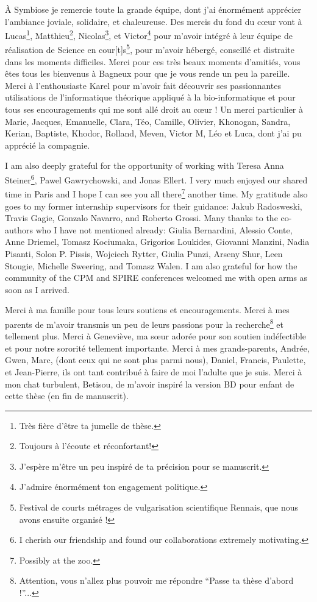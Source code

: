 À Symbiose je remercie toute la grande équipe, dont j'ai énormément apprécier l’ambiance joviale, solidaire, et chaleureuse.
Des mercis du fond du cœur vont à Lucas\footnote{Très fière d’être ta jumelle de thèse.}, Matthieu\footnote{Toujours à l'écoute et réconfortant!},  Nicolas\footnote{J’espère m’être un peu inspiré de ta précision pour se manuscrit.}, et Victor\footnote{J’admire énormément ton engagement politique.}  pour m’avoir intégré à leur équipe de réalisation de Science en cour[t]s\footnote{Festival de courts métrages de vulgarisation scientifique Rennais, que nous avons ensuite organisé !}, pour m’avoir hébergé, conseillé et distraite dans les moments difficiles. Merci pour ces très beaux moments d’amitiés, vous êtes tous les bienvenus à Bagneux pour que je vous rende un peu la pareille.
Merci à l’enthousiaste Karel pour m’avoir fait découvrir ses passionnantes utilisations de l’informatique théorique appliqué à la bio-informatique et pour tous ses encouragements qui me sont allé droit au cœur !
Un merci particulier à Marie, Jacques, Emanuelle, Clara, Téo, Camille, Olivier, Khonogan, Sandra, Kerian, Baptiste, Khodor, Rolland, Meven, Victor M, Léo et Luca, dont j’ai pu apprécié la compagnie.


I am also deeply grateful for the opportunity of working with Teresa Anna Steiner\footnote{I cherish our friendship and found our collaborations extremely motivating.}, Pawel Gawrychowski, and Jonas Ellert. I very much enjoyed our shared time in Paris and I hope I can see you all there\footnote{Possibly at the zoo.} another time.
My gratitude also goes to my former internship supervisors for their guidance: Jakub Radosweski, Travis Gagie, Gonzalo Navarro, and Roberto Grossi.
Many thanks to the co-authors who I have not mentioned already: Giulia Bernardini, Alessio Conte, Anne Driemel, Tomasz Kociumaka, Grigorios Loukides, Giovanni Manzini, Nadia Pisanti, Solon P. Pissis, Wojciech Rytter, Giulia Punzi, Arseny Shur, Leen Stougie, Michelle Sweering, and Tomasz Walen.
I am also grateful for how the community of the CPM and SPIRE conferences welcomed me with open arms as soon as I arrived.


Merci à ma famille pour tous leurs soutiens et encouragements. Merci à mes parents de m’avoir transmis un peu de leurs passions pour la recherche\footnote{Attention, vous n’allez plus pouvoir me répondre ``Passe ta thèse d’abord !''...} et tellement plus. Merci à Geneviève, ma sœur adorée pour son soutien indéfectible et pour notre sororité tellement importante. Merci à mes grands-parents, Andrée, Gwen, Marc, (dont ceux qui ne sont plus parmi nous), Daniel, Francis, Paulette, et Jean-Pierre, ils ont tant contribué à faire de moi l’adulte que je suis. Merci à mon chat turbulent, Betisou, de m’avoir inspiré la version BD pour enfant de cette thèse (en fin de manuscrit).

